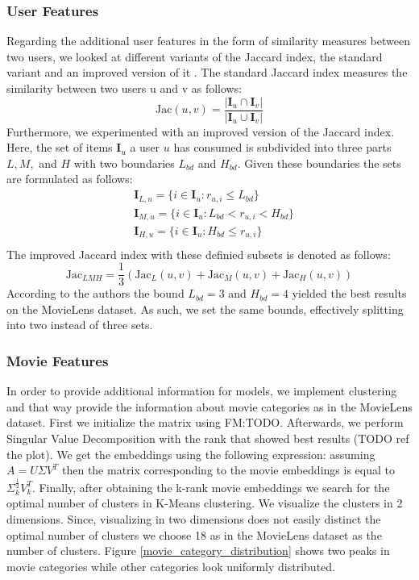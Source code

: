 \documentclass[10pt,conference,compsocconf]{IEEEtran}
\begin{document}
    \subsubsection{User Features}
    Regarding the additional user features in the form of similarity measures between two users, we looked at different variants of the Jaccard index, the standard variant and an improved version of it \cite{lee_improving_2017}.
    The standard Jaccard index measures the similarity between two users u and v as follows:
    $$\text{Jac}(u,v)=\frac{|\mathbf{I}_u \cap \mathbf{I}_v|}{|\mathbf{I}_u \cup \mathbf{I}_v|}$$
    Furthermore, we experimented with an improved version of the Jaccard index.
    Here, the set of items $\mathbf{I}_u$ a user $u$ has consumed is subdivided into three parts $L,M,$ and $H$ with two boundaries $L_{bd}$ and $H_{bd}$.
    Given these boundaries the sets are formulated as follows:
    \begin{align*}
        &\mathbf{I}_{L,u}=\{i \in \mathbf{I}_u : r_{u,i} \leq L_{bd}\}\\
        &\mathbf{I}_{M,u}=\{i \in \mathbf{I}_u : L_{bd} < r_{u,i} < H_{bd}\}\\
        &\mathbf{I}_{H,u}=\{i \in \mathbf{I}_u : H_{bd} \leq r_{u,i}\}\\
    \end{align*}
    The improved Jaccard index with these definied subsets is denoted as follows:
    $$\text{Jac}_{LMH}=\frac{1}{3}(\text{Jac}_L(u,v) + \text{Jac}_M(u,v) + \text{Jac}_H(u,v))$$
    According to the authors the bound $L_{bd} = 3$ and $H_{bd}=4$ yielded the best results on the MovieLens dataset.
    As such, we set the same bounds, effectively splitting into two instead of three sets.

    \subsubsection{Movie Features}
    In order to provide additional information for models, we implement clustering and that way provide the information
    about movie categories as in the MovieLens dataset. First we initialize the matrix using FM:TODO.
    Afterwards, we perform Singular Value Decomposition with the rank that showed best results (TODO ref the plot).
    We get the embeddings using the following expression: assuming $A=U\Sigma V^T$ then the matrix corresponding to the movie embeddings is equal to $\Sigma _k ^{\frac{1}{2}} V_k ^T$.
    Finally, after obtaining the k-rank movie embeddings we search for the optimal number of clusters in K-Means clustering.
    We visualize the clusters in 2 dimensions. Since, visualizing in two dimensions does not easily distinct the optimal
    number of clusters we choose 18 as in the MovieLens dataset as the number of clusters. Figure \ref{movie_category_distribution}
    shows two peaks in movie categories while other categories look uniformly distributed.
\end{document}
